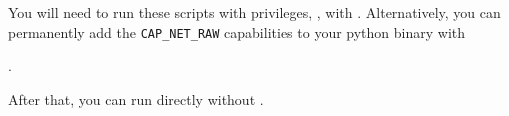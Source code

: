 \vfill

\begin{center}
\end{center}

\begin{center}
\end{center}

\begin{remark}
You will need to run these scripts with privileges, \eg, with .
% 
Alternatively, you can permanently add the \texttt{CAP\_NET\_RAW} capabilities
to your python binary with
\begin{center}
.  
\end{center}
% 
After that, you can run  directly without .\\[-0.5cm]
\end{remark}
